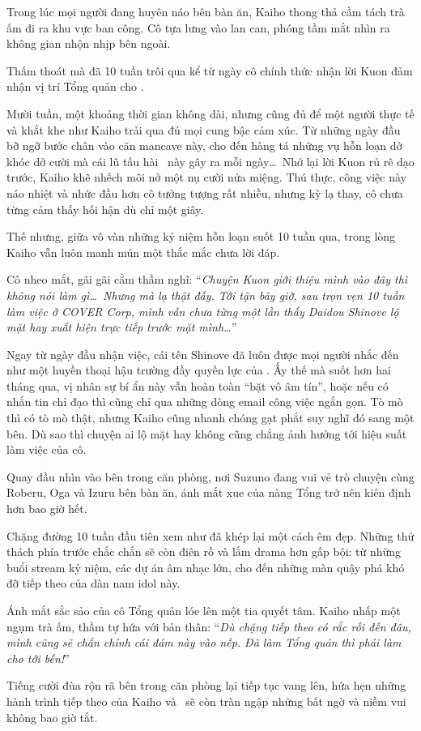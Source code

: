 \documentclass[../main.tex]{subfiles}
\begin{document}
\il

Trong lúc mọi người đang huyên náo bên bàn ăn, Kaiho thong thả cầm tách trà ấm đi ra khu vực ban công. Cô tựa lưng vào lan can, phóng tầm mắt nhìn ra không gian nhộn nhịp bên ngoài.

Thấm thoát mà đã 10 tuần trôi qua kể từ ngày cô chính thức nhận lời Kuon đảm nhận vị trí Tổng quản cho \hls.

Mười tuần, một khoảng thời gian không dài, nhưng cũng đủ để một người thực tế và khắt khe như Kaiho trải qua đủ mọi cung bậc cảm xúc. Từ những ngày đầu bỡ ngỡ bước chân vào căn mancave này, cho đến hàng tá những vụ hỗn loạn dở khóc dở cười mà cái lũ tấu hài \hls\ này gây ra mỗi ngày\dots\ Nhớ lại lời Kuon rủ rê dạo trước, Kaiho khẽ nhếch môi nở một nụ cười nửa miệng. Thú thực, công việc này náo nhiệt và nhức đầu hơn cô tưởng tượng rất nhiều, nhưng kỳ lạ thay, cô chưa từng cảm thấy hối hận dù chỉ một giây.

Thế nhưng, giữa vô vàn những kỷ niệm hỗn loạn suốt 10 tuần qua, trong lòng Kaiho vẫn luôn manh mún một thắc mắc chưa lời đáp.

Cô nheo mắt, gãi gãi cằm thầm nghĩ: ``\textit{Chuyện Kuon giới thiệu mình vào đây thì không nói làm gì\dots\ Nhưng mà lạ thật đấy. Tới tận bây giờ, sau trọn vẹn 10 tuần làm việc ở COVER Corp, mình vẫn chưa từng một lần thấy Daidou Shinove lộ mặt hay xuất hiện trực tiếp trước mặt mình\dots}''

Ngay từ ngày đầu nhận việc, cái tên Shinove đã luôn được mọi người nhắc đến như một huyền thoại hậu trường đầy quyền lực của \hls. Ấy thế mà suốt hơn hai tháng qua, vị nhân sự bí ẩn này vẫn hoàn toàn ``bặt vô âm tín'', hoặc nếu có nhắn tin chỉ đạo thì cũng chỉ qua những dòng email công việc ngắn gọn. Tò mò thì có tò mò thật, nhưng Kaiho cũng nhanh chóng gạt phắt suy nghĩ đó sang một bên. Dù sao thì chuyện ai lộ mặt hay không cũng chẳng ảnh hưởng tới hiệu suất làm việc của cô.

Quay đầu nhìn vào bên trong căn phòng, nơi Suzuno đang vui vẻ trò chuyện cùng Roberu, Oga và Izuru bên bàn ăn, ánh mắt xue của nàng Tổng trở nên kiên định hơn bao giờ hết.

Chặng đường 10 tuần đầu tiên xem như đã khép lại một cách êm đẹp. Những thử thách phía trước chắc chắn sẽ còn điên rồ và lắm drama hơn gấp bội: từ những buổi stream kỷ niệm, các dự án âm nhạc lớn, cho đến những màn quậy phá khó đỡ tiếp theo của dàn nam idol này.

Ánh mắt sắc sảo của cô Tổng quản lóe lên một tia quyết tâm. Kaiho nhấp một ngụm trà ấm, thầm tự hứa với bản thân: ``\textit{Dù chặng tiếp theo có rắc rối đến đâu, mình cũng sẽ chấn chỉnh cái đám này vào nếp. Đã làm Tổng quản thì phải làm cho tới bến!}''

Tiếng cười đùa rộn rã bên trong căn phòng lại tiếp tục vang lên, hứa hẹn những hành trình tiếp theo của Kaiho và \hls\ sẽ còn tràn ngập những bất ngờ và niềm vui không bao giờ tắt.
\end{document}
